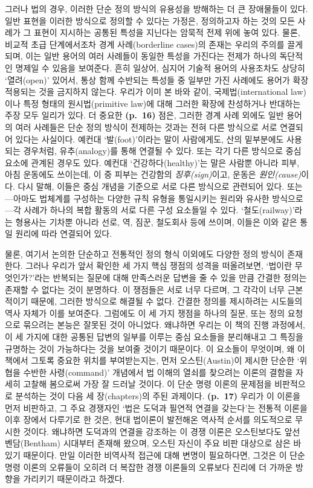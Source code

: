 \documentclass[12pt, oneside]{book}  %
\begin{document}
그러나 법의 경우, 이러한 단순 정의 방식의 유용성을 방해하는 더 큰
장애물들이 있다. 일반 표현을 이러한 방식으로 정의할 수 있다는 가정은,
정의하고자 하는 것의 모든 사례가 그 표현이 지시하는 공통된 특성을
지닌다는 암묵적 전제 위에 놓여 있다. 물론, 비교적 초급 단계에서조차 경계
사례(borderline cases)의 존재는 우리의 주의를 끌게 되며, 이는 일반
용어의 여러 사례들이 동일한 특성을 가진다는 전제가 하나의 독단적인
명제일 수 있음을 보여준다. 흔히 일상어, 심지어 기술적 용어의 사용조차도
상당히 `열려(open)' 있어서, 통상 함께 수반되는 특성들 중 일부만 가진
사례에도 용어가 확장 적용되는 것을 금지하지 않는다. 우리가 이미 본 바와
같이, 국제법(international law)이나 특정 형태의 원시법(primitive law)에
대해 그러한 확장에 찬성하거나 반대하는 주장 모두 일리가 있다. 더 중요한
\textbf{(p.~16)} 점은, 그러한 경계 사례 외에도 일반 용어의 여러 사례들은
단순 정의 방식이 전제하는 것과는 전혀 다른 방식으로 서로 연결되어 있다는
사실이다. 예컨대 `발(foot)'이라는 말이 사람에게도, 산의 밑부분에도
사용되는 경우처럼, 유추(analogy)를 통해 연결될 수 있다. 또는 각기 다른
방식으로 중심 요소에 관계된 경우도 있다. 예컨대 `건강하다(healthy)'는
말은 사람뿐 아니라 피부, 아침 운동에도 쓰이는데, 이 중 피부는 건강함의
\emph{징후(sign)}이고, 운동은 \emph{원인(cause)}이다. 다시 말해, 이들은
중심 개념을 기준으로 서로 다른 방식으로 관련되어 있다. 또는---아마도
법체계를 구성하는 다양한 규칙 유형을 통일시키는 원리와 유사한
방식으로---각 사례가 하나의 복합 활동의 서로 다른 구성 요소들일 수 있다.
`철도(railway)'라는 형용사는 기차뿐 아니라 선로, 역, 짐꾼, 철도회사 등에
쓰이며, 이들은 이와 같은 통일 원리에 따라 연결되어 있다.

물론, 여기서 논의한 단순하고 전통적인 정의 형식 이외에도 다양한 정의
방식이 존재한다. 그러나 우리가 앞서 확인한 세 가지 핵심 쟁점의 성격을
떠올려보면, `법이란 무엇인가?'라는 반복되는 질문에 대해 만족스러운
답변을 줄 수 있을 만큼 간결한 정의는 존재할 수 없다는 것이 분명하다. 이
쟁점들은 서로 너무 다르며, 그 각각이 너무 근본적이기 때문에, 그러한
방식으로 해결될 수 없다. 간결한 정의를 제시하려는 시도들의 역사 자체가
이를 보여준다. 그럼에도 이 세 가지 쟁점을 하나의 질문, 또는 정의
요청으로 묶으려는 본능은 잘못된 것이 아니었다. 왜냐하면 우리는 이 책의
진행 과정에서, 이 세 가지에 대한 공통된 답변의 일부를 이루는 중심
요소들을 분리해내고 그 특징을 규명하는 것이 가능하다는 것을 보여줄
것이기 때문이다. 이 요소들이 무엇이며, 왜 이 책에서 그토록 중요한 위치를
부여받는지는, 먼저 오스틴(Austin)이 제시한 단순한 `위협을 수반한
사령(command)' 개념에서 법 이해의 열쇠를 찾으려는 이론의 결함을 자세히
고찰해 봄으로써 가장 잘 드러날 것이다. 이 단순 명령 이론의 문제점을
비판적으로 분석하는 것이 다음 세 장(chapters)의 주된 과제이다.
\textbf{(p.~17)} 우리가 이 이론을 먼저 비판하고, 그 주요 경쟁자인 `법은
도덕과 필연적 연결을 갖는다'는 전통적 이론을 이후 장에서 다루기로 한
것은, 현대 법이론이 발전해온 역사적 순서를 의도적으로 무시한 것이다.
왜냐하면 도덕과의 연결을 강조하는 이 경쟁 이론은 오스틴보다도 앞선
벤담(Bentham) 시대부터 존재해 왔으며, 오스틴 자신이 주요 비판 대상으로
삼은 바 있기 때문이다. 만일 이러한 비역사적 접근에 대해 변명이
필요하다면, 그것은 이 단순 명령 이론의 오류들이 오히려 더 복잡한 경쟁
이론들의 오류보다 진리에 더 가까운 방향을 가리키기 때문이라고 하겠다.
\end{document}
